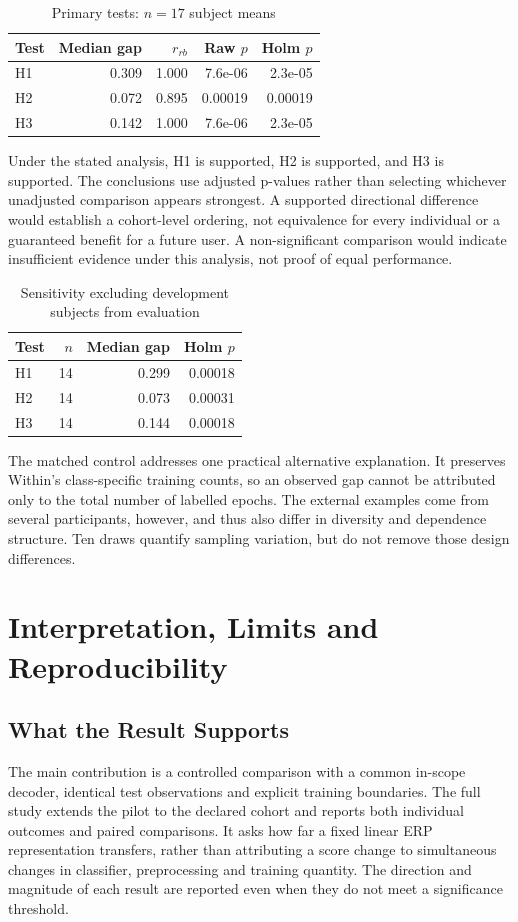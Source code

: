 \documentclass[conference]{IEEEtran}
\begin{document}
\begin{table}[!ht]\centering\caption{Primary tests: $n=17$ subject means}\small
\begin{tabular}{lrrrr}\toprule
Test & Median gap & $r_{rb}$ & Raw $p$ & Holm $p$\\\midrule
H1 & 0.309 & 1.000 & 7.6e-06 & 2.3e-05 \\
H2 & 0.072 & 0.895 & 0.00019 & 0.00019 \\
H3 & 0.142 & 1.000 & 7.6e-06 & 2.3e-05 \\
\bottomrule\end{tabular}\end{table}

Under the stated analysis, H1 is supported, H2 is supported, and H3 is supported.
The conclusions use adjusted p-values rather than selecting whichever unadjusted
comparison appears strongest. A supported directional difference would establish a
cohort-level ordering, not equivalence for every individual or a guaranteed benefit
for a future user. A non-significant comparison would indicate insufficient evidence
under this analysis, not proof of equal performance.

\begin{table}[!ht]\centering\caption{Sensitivity excluding development subjects from evaluation}\small
\begin{tabular}{lrrr}\toprule
Test & $n$ & Median gap & Holm $p$\\\midrule
H1 & 14 & 0.299 & 0.00018 \\
H2 & 14 & 0.073 & 0.00031 \\
H3 & 14 & 0.144 & 0.00018 \\
\bottomrule\end{tabular}\end{table}

The matched control addresses one practical alternative explanation. It preserves
Within's class-specific training counts, so an observed gap cannot be attributed only
to the total number of labelled epochs. The external examples come from several
participants, however, and thus also differ in diversity and dependence structure.
Ten draws quantify sampling variation, but do not remove those design differences.

\clearpage
\section{Interpretation, Limits and Reproducibility}
\subsection{What the Result Supports}
The main contribution is a controlled comparison with a common in-scope decoder,
identical test observations and explicit training boundaries. The full study extends
the pilot to the declared cohort and reports both individual outcomes and paired
comparisons. It asks how far a fixed linear ERP representation transfers, rather than
attributing a score change to simultaneous changes in classifier, preprocessing and
training quantity. The direction and magnitude of each result are reported even when
they do not meet a significance threshold.
\end{document}
